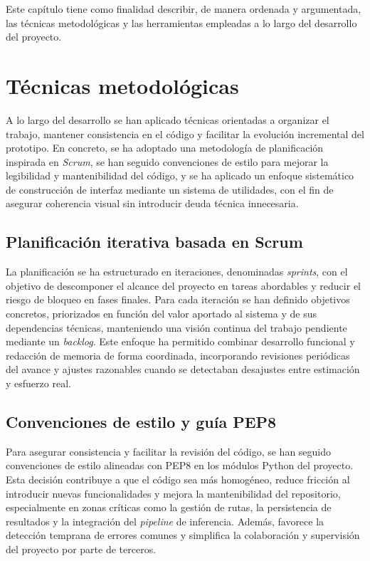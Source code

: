 
Este capítulo tiene como finalidad describir, de manera ordenada y argumentada, las técnicas metodológicas y las herramientas empleadas a lo largo del desarrollo del proyecto.

\section{Técnicas metodológicas}

A lo largo del desarrollo se han aplicado técnicas orientadas a organizar el trabajo, mantener consistencia en el código y facilitar la evolución incremental del prototipo. En concreto, se ha adoptado una metodología de planificación inspirada en \textit{Scrum}, se han seguido convenciones de estilo para mejorar la legibilidad y mantenibilidad del código, y se ha aplicado un enfoque sistemático de construcción de interfaz mediante un sistema de utilidades, con el fin de asegurar coherencia visual sin introducir deuda técnica innecesaria.

\subsection{Planificación iterativa basada en Scrum}

La planificación se ha estructurado en iteraciones, denominadas \textit{sprints}, con el objetivo de descomponer el alcance del proyecto en tareas abordables y reducir el riesgo de bloqueo en fases finales. Para cada iteración se han definido objetivos concretos, priorizados en función del valor aportado al sistema y de sus dependencias técnicas, manteniendo una visión continua del trabajo pendiente mediante un \textit{backlog}. Este enfoque ha permitido combinar desarrollo funcional y redacción de memoria de forma coordinada, incorporando revisiones periódicas del avance y ajustes razonables cuando se detectaban desajustes entre estimación y esfuerzo real.

\subsection{Convenciones de estilo y guía PEP8}

Para asegurar consistencia y facilitar la revisión del código, se han seguido convenciones de estilo alineadas con PEP8 en los módulos Python del proyecto. Esta decisión contribuye a que el código sea más homogéneo, reduce fricción al introducir nuevas funcionalidades y mejora la mantenibilidad del repositorio, especialmente en zonas críticas como la gestión de rutas, la persistencia de resultados y la integración del \textit{pipeline} de inferencia. Además, favorece la detección temprana de errores comunes y simplifica la colaboración y supervisión del proyecto por parte de terceros.

